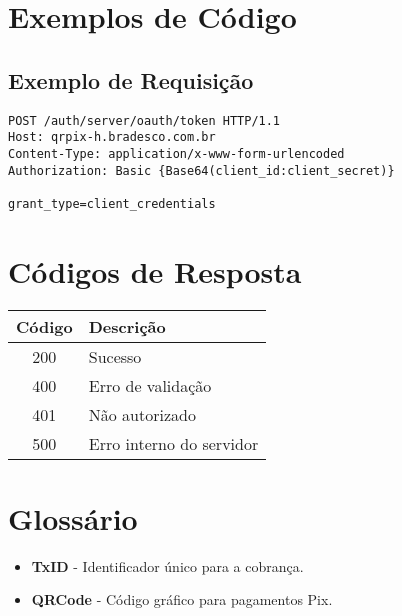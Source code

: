 \documentclass{apiDoc}
\begin{document}
\section{Exemplos de Código}
\subsection{Exemplo de Requisição}
\begin{lstlisting}
POST /auth/server/oauth/token HTTP/1.1
Host: qrpix-h.bradesco.com.br
Content-Type: application/x-www-form-urlencoded
Authorization: Basic {Base64(client_id:client_secret)}

grant_type=client_credentials
\end{lstlisting}

\section{Códigos de Resposta}
\begin{tabular}{|c|l|}
\hline
\textbf{Código} & \textbf{Descrição} \\
\hline
200 & Sucesso \\
400 & Erro de validação \\
401 & Não autorizado \\
500 & Erro interno do servidor \\
\hline
\end{tabular}

\section{Glossário}
\begin{itemize}
  \item \textbf{TxID} - Identificador único para a cobrança.
  \item \textbf{QRCode} - Código gráfico para pagamentos Pix.
\end{itemize}
\end{document}
